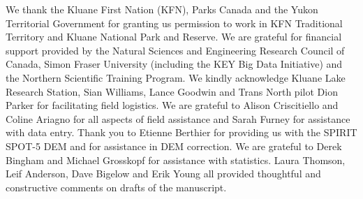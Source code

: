 \documentclass{article}
\begin{document}
We thank the Kluane First Nation (KFN), Parks Canada and the Yukon Territorial Government for granting us permission to work in KFN Traditional Territory and Kluane National Park and Reserve. We are grateful for financial support provided by the Natural Sciences and Engineering Research Council of Canada, Simon Fraser University (including the KEY Big Data Initiative) and the Northern Scientific Training Program. We kindly acknowledge Kluane Lake Research Station, Sian Williams, Lance Goodwin and Trans North pilot Dion Parker for facilitating field logistics. We are grateful to Alison Criscitiello and Coline Ariagno for all aspects of field assistance and Sarah Furney for assistance with data entry. Thank you to Etienne Berthier for providing us with the SPIRIT SPOT-5 DEM and for assistance in DEM correction. We are grateful to Derek Bingham and Michael Grosskopf for assistance with statistics. Laura Thomson, Leif Anderson, Dave Bigelow and Erik Young all provided thoughtful and constructive comments on drafts of the manuscript.


%
%
%
%
%

\end{document}
